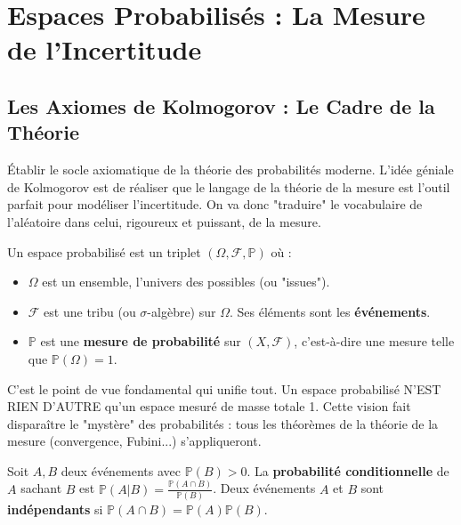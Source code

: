\chapter{Espaces Probabilisés : La Mesure de l'Incertitude}

\section{Les Axiomes de Kolmogorov : Le Cadre de la Théorie}

\begin{objectif}
    Établir le socle axiomatique de la théorie des probabilités moderne. L'idée géniale de Kolmogorov est de réaliser que le langage de la théorie de la mesure est l'outil parfait pour modéliser l'incertitude. On va donc "traduire" le vocabulaire de l'aléatoire dans celui, rigoureux et puissant, de la mesure.
\end{objectif}

\begin{definition}
    Un espace probabilisé est un triplet $(\Omega, \mathcal{F}, \mathbb{P})$ où :
    \begin{itemize}
        \item $\Omega$ est un ensemble, l'univers des possibles (ou "issues").
        \item $\mathcal{F}$ est une tribu (ou $\sigma$-algèbre) sur $\Omega$. Ses éléments sont les \textbf{événements}.
        \item $\mathbb{P}$ est une \textbf{mesure de probabilité} sur $(X, \mathcal{F})$, c'est-à-dire une mesure telle que $\mathbb{P}(\Omega)=1$.
    \end{itemize}
\end{definition}

\begin{remark}
    C'est le point de vue fondamental qui unifie tout. Un espace probabilisé N'EST RIEN D'AUTRE qu'un espace mesuré de masse totale 1. Cette vision fait disparaître le "mystère" des probabilités : tous les théorèmes de la théorie de la mesure (convergence, Fubini...) s'appliqueront.
\end{remark}

\begin{definition}
    Soit $A, B$ deux événements avec $\mathbb{P}(B)>0$. La \textbf{probabilité conditionnelle} de $A$ sachant $B$ est $\mathbb{P}(A|B) = \frac{\mathbb{P}(A \cap B)}{\mathbb{P}(B)}$.
    Deux événements $A$ et $B$ sont \textbf{indépendants} si $\mathbb{P}(A \cap B) = \mathbb{P}(A)\mathbb{P}(B)$.
\end{definition}

